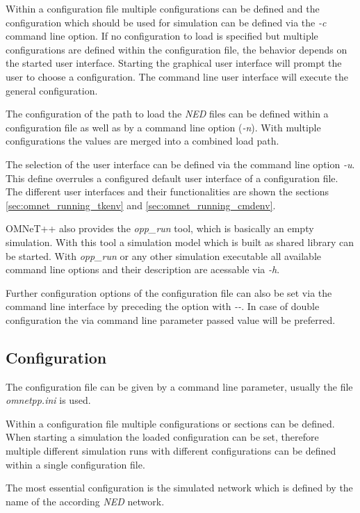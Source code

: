 Within a configuration file multiple configurations can be defined and the configuration which should be used for simulation can be defined via the \emph{-c} command line option.
If no configuration to load is specified but multiple configurations are defined within the configuration file, the behavior depends on the started user interface.
Starting the graphical user interface will prompt the user to choose a configuration.
The command line user interface will execute the general configuration.

The configuration of the path to load the \emph{NED} files can be defined within a configuration file as well as by a command line option (\emph{-n}).
With multiple configurations the values are merged into a combined load path.

The selection of the user interface can be defined via the command line option \emph{-u}.
This define overrules a configured default user interface of a configuration file.
The different user interfaces and their functionalities are shown the sections \ref{sec:omnet_running_tkenv} and \ref{sec:omnet_running_cmdenv}.

OMNeT++ also provides the \emph{opp\_run} tool, which is basically an empty simulation.
With this tool a simulation model which is built as shared library can be started.
With \emph{opp\_run} or any other simulation executable all available command line options and their description are acessable via \emph{-h}.

Further configuration options of the configuration file can also be set via the command line interface by preceding the option with \emph{-{}-}.
In case of double configuration the via command line parameter passed value will be preferred. \cite[section 10.1.1, section 10.1.2]{omnet_manual}

\subsection{Configuration}
\label{sec:omnet_running_config}
The configuration file can be given by a command line parameter, usually the file \emph{omnetpp.ini} is used.

Within a configuration file multiple configurations or sections can be defined.
When starting a simulation the loaded configuration can be set, therefore multiple different simulation runs with different configurations can be defined within a single configuration file. \cite[section 9.2]{omnet_manual}

The most essential configuration is the simulated network which is defined by the name of the according \emph{NED} network.

